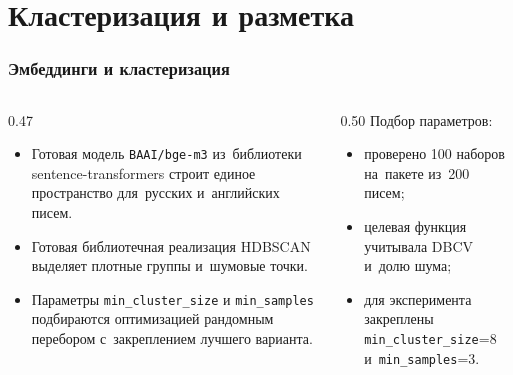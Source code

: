 \section{Кластеризация и разметка}

\begin{frame}
    \frametitle{Эмбеддинги и кластеризация}
    \begin{columns}[T,onlytextwidth]
        \begin{column}{0.47\linewidth}
            \small
            \begin{itemize}
                \item Готовая модель \texttt{BAAI/bge-m3} из~библиотеки
                      sentence-transformers строит единое пространство
                      для~русских и~английских писем.
                \item Готовая библиотечная реализация HDBSCAN выделяет
                      плотные группы и~шумовые точки.
                \item Параметры \texttt{min\_cluster\_size} и
                      \texttt{min\_samples} подбираются оптимизацией
                      рандомным перебором с~закреплением лучшего варианта.
            \end{itemize}
        \end{column}
        \begin{column}{0.50\linewidth}
            \small
            Подбор параметров:
            \begin{itemize}
                \item проверено 100 наборов на~пакете из~200 писем;
                \item целевая функция учитывала DBCV и~долю шума;
                \item для эксперимента закреплены
                      \texttt{min\_cluster\_size}=8 и~\texttt{min\_samples}=3.
            \end{itemize}
        \end{column}
    \end{columns}
\end{frame}

